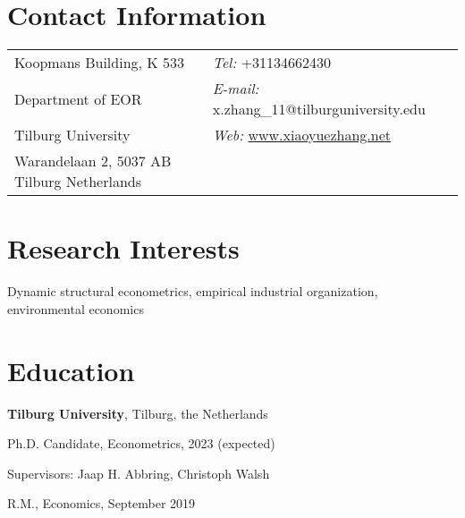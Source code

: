 \documentclass[margin,line]{res}
\newenvironment{list1}{
  \begin{list}{\ding{113}}{%
      \setlength{\itemsep}{0in}
      \setlength{\parsep}{0in} \setlength{\parskip}{0in}
      \setlength{\topsep}{0in} \setlength{\partopsep}{0in} 
      \setlength{\leftmargin}{0.17in}}}{\end{list}}
\newenvironment{list2}{
  \begin{list}{$\bullet$}{%
      \setlength{\itemsep}{0in}
      \setlength{\parsep}{0in} \setlength{\parskip}{0in}
      \setlength{\topsep}{0in} \setlength{\partopsep}{0in} 
      \setlength{\leftmargin}{0.2in}}}{\end{list}}
\begin{document}

\begin{resume}
\section{\sc Contact Information}
\vspace{.05in}
\begin{tabular}{@{}p{2in}p{4in}}
Koopmans Building, K 533     & {\it Tel:}  +31134662430 \\            
Department of EOR   &  {\it E-mail:}  x.zhang\_11@tilburguniversity.edu\\         
Tilburg University &{\it Web:} \url{www.xiaoyuezhang.net} \\       
Warandelaan 2, 5037 AB Tilburg Netherlands  & \\     
\end{tabular}

\section{\sc Research Interests}
Dynamic structural econometrics, empirical industrial organization, environmental economics%

\section{\sc Education}
{\bf Tilburg University}, Tilburg, the Netherlands\\
\vspace*{-.1in}
\begin{list1}
\item[] Ph.D. Candidate, Econometrics, 2023 (expected) 
\vspace*{.05in}
\item[] Supervisors:  Jaap H. Abbring, Christoph Walsh
%
%
\vspace*{.05in}
\item[] R.M., Economics,  September 2019
\end{list1}


\end{resume}
\end{document}
